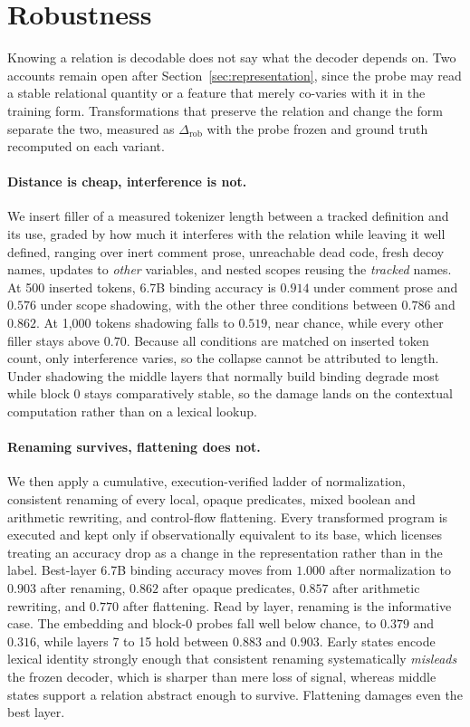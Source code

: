 \documentclass{article}
\begin{document}
\section{Robustness}
\label{sec:robustness}

Knowing a relation is decodable does not say what the decoder depends on. Two accounts remain open after Section~\ref{sec:representation}, since the probe may read a stable relational quantity or a feature that merely co-varies with it in the training form. Transformations that preserve the relation and change the form separate the two, measured as $\Delta_{\mathrm{rob}}$ with the probe frozen and ground truth recomputed on each variant.

\paragraph{Distance is cheap, interference is not.}
We insert filler of a measured tokenizer length between a tracked definition and its use, graded by how much it interferes with the relation while leaving it well defined, ranging over inert comment prose, unreachable dead code, fresh decoy names, updates to \emph{other} variables, and nested scopes reusing the \emph{tracked} names. At 500 inserted tokens, 6.7B binding accuracy is $0.914$ under comment prose and $0.576$ under scope shadowing, with the other three conditions between $0.786$ and $0.862$. At 1{,}000 tokens shadowing falls to $0.519$, near chance, while every other filler stays above $0.70$. Because all conditions are matched on inserted token count, only interference varies, so the collapse cannot be attributed to length. Under shadowing the middle layers that normally build binding degrade most while block 0 stays comparatively stable, so the damage lands on the contextual computation rather than on a lexical lookup.

\paragraph{Renaming survives, flattening does not.}
We then apply a cumulative, execution-verified ladder of normalization, consistent renaming of every local, opaque predicates, mixed boolean and arithmetic rewriting, and control-flow flattening. Every transformed program is executed and kept only if observationally equivalent to its base, which licenses treating an accuracy drop as a change in the representation rather than in the label. Best-layer 6.7B binding accuracy moves from $1.000$ after normalization to $0.903$ after renaming, $0.862$ after opaque predicates, $0.857$ after arithmetic rewriting, and $0.770$ after flattening. Read by layer, renaming is the informative case. The embedding and block-0 probes fall well below chance, to $0.379$ and $0.316$, while layers 7 to 15 hold between $0.883$ and $0.903$. Early states encode lexical identity strongly enough that consistent renaming systematically \emph{misleads} the frozen decoder, which is sharper than mere loss of signal, whereas middle states support a relation abstract enough to survive. Flattening damages even the best layer.
\end{document}
